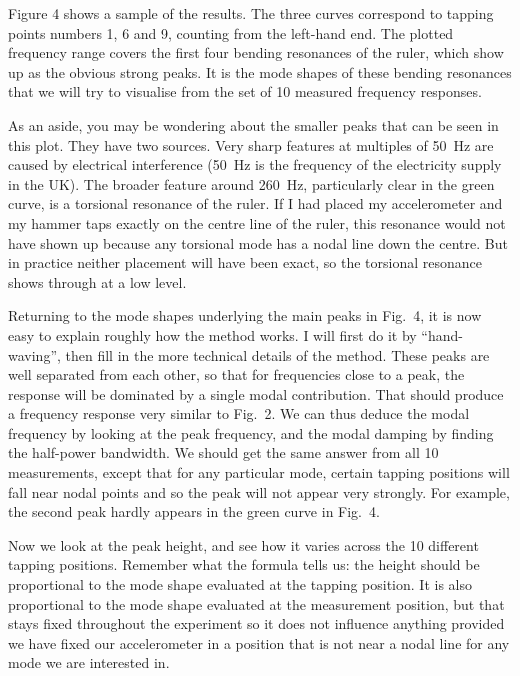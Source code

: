   Figure 4 shows a sample of the results. The three curves correspond to 
  tapping points numbers 1, 6 and 9, counting from the left-hand end. The 
  plotted frequency range covers the first four bending resonances of the 
  ruler, which show up as the obvious strong peaks. It is the mode shapes of 
  these bending resonances that we will try to visualise from the set of 10 
  measured frequency responses. 


  As an aside, you may be wondering about the smaller peaks that can be seen in 
  this plot. They have two sources. Very sharp features at multiples of 50~Hz 
  are caused by electrical interference (50~Hz is the frequency of the 
  electricity supply in the UK). The broader feature around 260~Hz, 
  particularly clear in the green curve, is a torsional resonance of the ruler. 
  If I had placed my accelerometer and my hammer taps exactly on the centre 
  line of the ruler, this resonance would not have shown up because any 
  torsional mode has a nodal line down the centre. But in practice neither 
  placement will have been exact, so the torsional resonance shows through at a 
  low level. 

  Returning to the mode shapes underlying the main peaks in Fig.\ 4, it is now 
  easy to explain roughly how the method works. I will first do it by 
  “hand-waving”, then fill in the more technical details of the method. These 
  peaks are well separated from each other, so that for frequencies close to a 
  peak, the response will be dominated by a single modal contribution. That 
  should produce a frequency response very similar to Fig.\ 2. We can thus 
  deduce the modal frequency by looking at the peak frequency, and the modal 
  damping by finding the half-power bandwidth. We should get the same answer 
  from all 10 measurements, except that for any particular mode, certain 
  tapping positions will fall near nodal points and so the peak will not appear 
  very strongly. For example, the second peak hardly appears in the green curve 
  in Fig.\ 4. 

  Now we look at the peak height, and see how it varies across the 10 different 
  tapping positions. Remember what the formula tells us: the height should be 
  proportional to the mode shape evaluated at the tapping position. It is also 
  proportional to the mode shape evaluated at the measurement position, but 
  that stays fixed throughout the experiment so it does not influence anything 
  provided we have fixed our accelerometer in a position that is not near a 
  nodal line for any mode we are interested in. 

